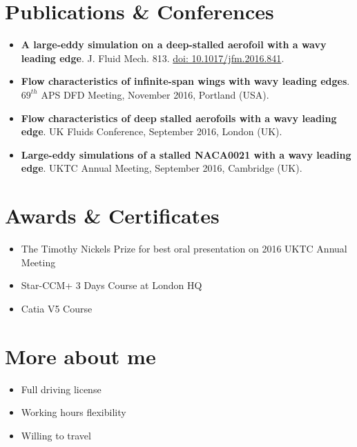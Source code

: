 \documentclass[fontsize=10pt]{tccv}
\begin{document}
\vspace{-25pt}
\section{Publications \& Conferences} 
  	\begin{itemize}
	\itemsep -2pt
\item \textbf{A large-eddy simulation on a deep-stalled aerofoil with a wavy leading edge}. J. Fluid Mech. 813. \href{https://doi.org/10.1017/jfm.2016.841}{doi: 10.1017/jfm.2016.841}.
\item \textbf{Flow characteristics of infinite-span wings with wavy leading edges}. $69^{th}$ APS DFD Meeting, November 2016, Portland (USA). 
\item \textbf{Flow characteristics of deep stalled aerofoils with a wavy
leading edge}. UK Fluids Conference, September 2016, London (UK). 
\item \textbf{Large-eddy simulations of a stalled NACA0021 with a wavy
leading edge}. UKTC Annual Meeting, September 2016, Cambridge (UK).
	\end{itemize}

\vspace{-25pt}
\section{Awards \& Certificates} 
  	\begin{itemize}
	\itemsep -2pt
	\item The Timothy Nickels Prize for best oral presentation on 2016 UKTC Annual Meeting
	\item Star-CCM+ 3 Days Course at London HQ
	\item Catia V5 Course
	\end{itemize}

\vspace{-22pt}
\section{More about me} 
\begin{itemize}
	\itemsep -2pt
	\item Full driving license
	\item Working hours flexibility
	\item Willing to travel
\end{itemize}
\end{document}
